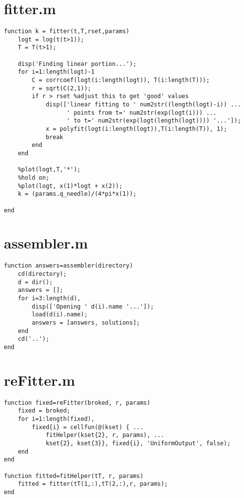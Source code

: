 \section{fitter.m}
\small
\begin{verbatim}
function k = fitter(t,T,rset,params)
    logt = log(t(t>1));
    T = T(t>1);

    disp('Finding linear portion...');    
    for i=1:length(logt)-1
        C = corrcoef(logt(i:length(logt)), T(i:length(T)));
        r = sqrt(C(2,1));
        if r > rset %adjust this to get 'good' values
            disp(['linear fitting to ' num2str((length(logt)-i)) ...
                  ' points from t=' num2str(exp(logt(i))) ...
                  ' to t=' num2str(exp(logt(length(logt)))) '...']);
            x = polyfit(logt(i:length(logt)),T(i:length(T)), 1);
            break
        end
    end

    %plot(logt,T,'*');
    %hold on;
    %plot(logt, x(1)*logt + x(2));
    k = (params.q_needle)/(4*pi*x(1));

end
\end{verbatim}
\normalsize

\section{assembler.m}
\small
\begin{verbatim}
function answers=assembler(directory)
    cd(directory);
    d = dir();
    answers = [];
    for i=3:length(d),
        disp(['Opening ' d(i).name '...']);
        load(d(i).name);
        answers = [answers, solutions];
    end
    cd('..');
end
\end{verbatim}
\normalsize

\section{reFitter.m}
\small
\begin{verbatim}
function fixed=reFitter(broked, r, params)
    fixed = broked;
    for i=1:length(fixed),
        fixed{i} = cellfun(@(kset) { ...
            fitHelper(kset{2}, r, params), ...
            kset{2}, kset{3}}, fixed{i}, 'UniformOutput', false);
    end
end

function fitted=fitHelper(tT, r, params)
    fitted = fitter(tT(1,:),tT(2,:),r, params);
end
\end{verbatim}
\normalsize


